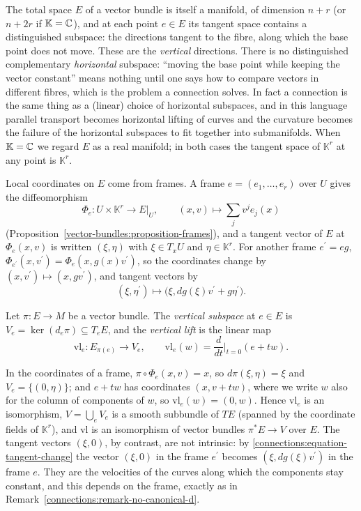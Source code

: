 The total space $E$ of a vector bundle is itself a manifold, of dimension $n + r$ (or $n + 2r$ if $\mathbb{K} = \mathbb{C}$), and at each point $e \in E$ its tangent space contains a
distinguished subspace: the directions tangent to the fibre, along which the base point does not move. These are the \emph{vertical} directions. There is no distinguished complementary
\emph{horizontal} subspace: ``moving the base point while keeping the vector constant'' means nothing until one says how to compare vectors in different fibres, which is the problem a
connection solves. In fact a connection is the same thing as a (linear) choice of horizontal subspaces, and in this language parallel transport becomes horizontal lifting of curves and
the curvature becomes the failure of the horizontal subspaces to fit together into submanifolds. When $\mathbb{K} = \mathbb{C}$ we regard $E$ as a real manifold; in both cases the tangent space of
$\mathbb{K}^r$ at any point is $\mathbb{K}^r$.

Local coordinates on $E$ come from frames. A frame $e = (e_1, \ldots, e_r)$ over $U$ gives the diffeomorphism
\[
\Phi_e \colon U \times \mathbb{K}^r \to E|_U, \qquad (x, v) \mapsto \sum_jv^je_j(x)
\]
(Proposition~\ref{vector-bundles:proposition-frames}), and a tangent vector of $E$ at $\Phi_e(x, v)$ is written $(\xi, \eta)$ with $\xi \in T_xU$ and $\eta \in \mathbb{K}^r$. For another frame
$e^{\prime} = eg$, $\Phi_{e^{\prime}}(x, v^{\prime}) = \Phi_e(x, g(x)v^{\prime})$, so the coordinates change by $(x, v^{\prime}) \mapsto (x, gv^{\prime})$, and tangent vectors by
\begin{equation}\label{connections:equation-tangent-change}
(\xi, \eta^{\prime}) \longmapsto \bigl(\xi, dg(\xi)v^{\prime} + g\eta^{\prime}\bigr).
\end{equation}

\begin{definition}\label{connections:definition-vertical}
Let $\pi \colon E \to M$ be a vector bundle. The \emph{vertical subspace} at $e \in E$ is $V_e = \ker(d_e\pi) \subseteq T_eE$, and the \emph{vertical lift} is the linear map
\[
\mathrm{vl}_e \colon E_{\pi(e)} \to V_e, \qquad \mathrm{vl}_e(w) = \frac{d}{dt}\Big|_{t=0}(e + tw).
\]
\end{definition}

In the coordinates of a frame, $\pi \circ \Phi_e(x, v) = x$, so $d\pi(\xi, \eta) = \xi$ and $V_e = \{(0, \eta)\}$; and $e + tw$ has coordinates $(x, v + tw)$, where we write $w$ also for the
column of components of $w$, so $\mathrm{vl}_e(w) = (0, w)$. Hence $\mathrm{vl}_e$ is an isomorphism, $V = \bigcup_eV_e$ is a smooth subbundle of $TE$ (spanned by the coordinate fields of
$\mathbb{K}^r$), and $\mathrm{vl}$ is an isomorphism of vector bundles $\pi^*E \to V$ over $E$. The tangent vectors $(\xi, 0)$, by contrast, are not intrinsic: by
\eqref{connections:equation-tangent-change} the vector $(\xi, 0)$ in the frame $e^{\prime}$ becomes $(\xi, dg(\xi)v^{\prime})$ in the frame $e$. They are the velocities of the curves along which
the components stay constant, and this depends on the frame, exactly as in Remark~\ref{connections:remark-no-canonical-d}.

